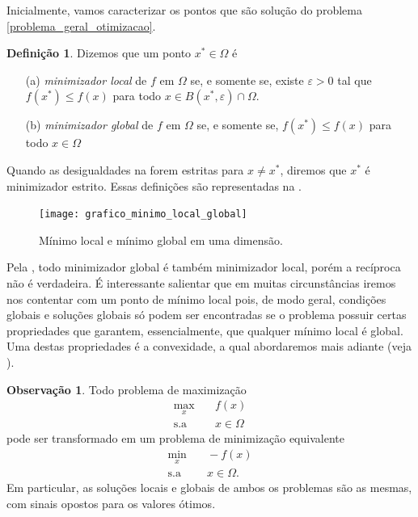 \documentclass[12pt,a4paper]{scrartcl}
\theoremstyle{definition}%
\newtheorem{defi}{Definição}
\newtheorem{obs}{Observação}
\begin{document}
Inicialmente, vamos caracterizar os pontos que são solução do problema \eqref{problema_geral_otimizacao}.

\begin{defi} \label{defi:minimizador_local_global}
Dizemos que um ponto $x^{*} \in \Omega$ é
\begin{enumerate}
	\item[(a)] \emph{minimizador local} de $f$ em $\Omega$ se, e somente se, existe $\varepsilon >0$ tal que $f(x^{*}) \leq f(x)$ para todo $x \in B(x^{*}, \varepsilon) \cap \Omega$.

	\item[(b)] \emph{minimizador global} de $f$ em $\Omega$ se, e somente se, $f(x^{*}) \leq f(x)$ para todo $x \in \Omega$
\end{enumerate} 
\end{defi}

Quando as desigualdades na  forem estritas para $x \neq x^{*}$, diremos que $x^{*}$ é minimizador estrito. Essas definições são representadas na .

\begin{figure}[!ht] 
	\centering
	\texttt{[image: grafico\_minimo\_local\_global]}
	\caption{ Mínimo local e mínimo global em uma dimensão. \label{fig:grafico_minimo_local_global}}
\end{figure}

Pela , todo minimizador global é também minimizador local, porém a recíproca não é verdadeira. É interessante salientar que em muitas circunstâncias iremos nos contentar com um ponto de mínimo local pois, de modo geral, condições globais e soluções globais só podem ser encontradas se o problema possuir certas propriedades que garantem, essencialmente, que qualquer mínimo local é global. Uma destas propriedades é a convexidade, a qual abordaremos mais adiante (veja ).

\begin{obs}
Todo problema de maximização
\[
\begin{aligned}
\max_{x} & \quad f(x) \\
\text{s.a} & \quad x \in \Omega \end{aligned}
 \]
pode ser transformado em um problema de minimização equivalente
\[
\begin{aligned}
\min_{x} & \quad -f(x) \\
\text{s.a} & \quad x \in \Omega .\end{aligned}
\]
Em particular, as soluções locais e globais de ambos os problemas são as mesmas, com sinais opostos para os valores ótimos.
\end{obs} %
\end{document}
